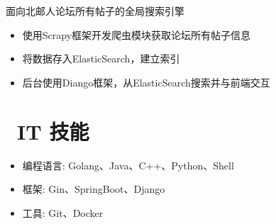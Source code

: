 \documentclass{resume}
\begin{document}


\begin{onehalfspacing}
面向北邮人论坛所有帖子的全局搜索引擎
\begin{itemize}
  \item 使用Scrapy框架开发爬虫模块获取论坛所有帖子信息
  \item 将数据存入ElasticSearch，建立索引
  \item 后台使用Diango框架，从ElasticSearch搜索并与前端交互
\end{itemize}
\end{onehalfspacing}


\section{\faCogs\ IT 技能}
\begin{itemize}[parsep=0.5ex]
  \item 编程语言: Golang、Java、C++、Python、Shell
  \item 框架: Gin、SpringBoot、Django
  \item 工具: Git、Docker
\end{itemize}
\end{document}
